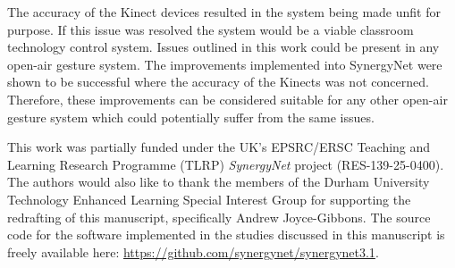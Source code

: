 \documentclass[link]{IWCOMP}
\begin{document}
The accuracy of the Kinect devices resulted in the system being made unfit for purpose.
If this issue was resolved the system would be a viable classroom technology control system.
Issues outlined in this work could be present in any open-air gesture system.
The improvements implemented into SynergyNet were shown to be successful where the accuracy of the Kinects was not concerned.
Therefore, these improvements can be considered suitable for any other open-air gesture system which could potentially suffer from the same issues.

\begin{ack}

This work was partially funded under the UK's EPSRC/ERSC Teaching and Learning Research Programme (TLRP) {\emph{SynergyNet}} project (RES-139-25-0400).
The authors would also like to thank the members of the Durham University Technology Enhanced Learning Special Interest Group for supporting the redrafting of this manuscript, specifically Andrew Joyce-Gibbons.
The source code for the software implemented in the studies discussed in this manuscript is freely available here: \url{https://github.com/synergynet/synergynet3.1}.

\end{ack}

\makeatletter
\def\@biblabel#1{}
\makeatother



\end{document}
